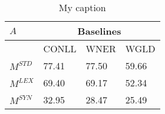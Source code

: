 \begin{table}[]
\centering
\begin{tabular}{@{}llll@{}}
	\toprule
	$A$       & \multicolumn{3}{c}{Baselines} \\ \midrule
	          & CONLL & WNER  & WGLD          \\
	$M^{STD}$ & 77.41 & 77.50 & 59.66         \\
	$M^{LEX}$ & 69.40 & 69.17 & 52.34         \\
	$M^{SYN}$ & 32.95 & 28.47 & 25.49         \\ \bottomrule
\end{tabular}
\caption{My caption}
\label{my-label}
\end{table}

